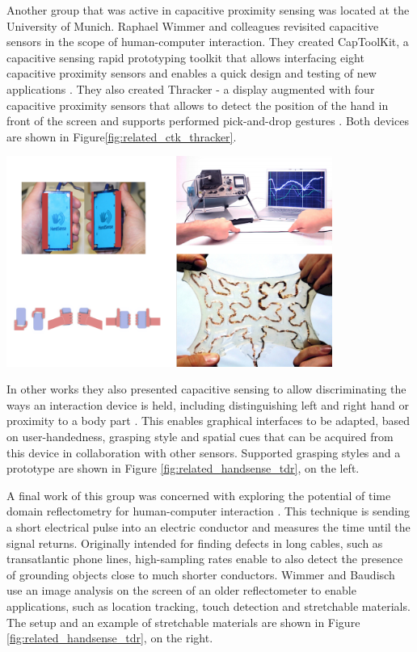Another group that was active in capacitive proximity sensing was located at the University of Munich. Raphael Wimmer and colleagues revisited capacitive sensors in the scope of human-computer interaction. They created CapToolKit, a capacitive sensing rapid prototyping toolkit that allows interfacing eight capacitive proximity sensors and enables a quick design and testing of new applications  \cite{Wimmer2007a}. They also created Thracker - a display augmented with four capacitive proximity sensors that allows to detect the position of the hand in front of the screen and supports performed pick-and-drop gestures \cite{Wimmer2006}. Both devices are shown in Figure\ref{fig:related_ctk_thracker}.

\begin{minipage}{\linewidth}
\centering
\includegraphics[width=0.8\textwidth]{images/related_handsense_tdr}
\label{fig:related_handsense_tdr}
\end{minipage}

In other works they also presented capacitive sensing to allow discriminating the ways an interaction device is held, including distinguishing left and right hand or proximity to a body part \cite{ wimmer2009handsense}. This enables graphical interfaces to be adapted, based on user-handedness, grasping style and spatial cues that can be acquired from this device in collaboration with other sensors. Supported grasping styles and a prototype are shown in Figure \ref{fig:related_handsense_tdr}, on the left.

A final work of this group was concerned with exploring the potential of time domain reflectometry for human-computer interaction \cite{wimmer2011modular}. This technique is sending a short electrical pulse into an electric conductor and measures the time until the signal returns. Originally intended for finding defects in long cables, such as transatlantic phone lines, high-sampling rates enable to also detect the presence of grounding objects close to much shorter conductors. Wimmer and Baudisch use an image analysis on the screen of an older reflectometer to enable applications, such as location tracking, touch detection and stretchable materials. The setup and an example of stretchable materials are shown in Figure \ref{fig:related_handsense_tdr}, on the right.

